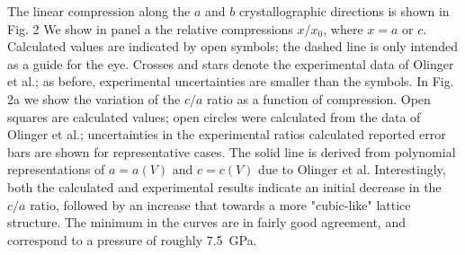 \documentclass[prb,aps,nobibnotes,twocolumn,doublespace,twocolumngrid,superbib]{revtex4}
\begin{document}
The linear compression along the $a$ and $b$ crystallographic directions
is shown in Fig. 2  We show in panel a the relative compressions $x/x_0$, 
where $x=a$ or $c$.  Calculated values are indicated by open symbols; the 
dashed line is only intended as a guide for the eye.  Crosses and stars 
denote the experimental data of Olinger et al.; as before, experimental 
uncertainties are smaller than the symbols.  In Fig. 2a we show the variation
of the $c/a$ ratio as a function of compression.  Open squares are 
calculated values; open circles were calculated from the data of Olinger
et al.; uncertainties in the experimental ratios calculated reported 
error bars are shown for representative cases.  The solid line is derived
from polynomial representations of $a=a(V)$ and $c=c(V)$ due to Olinger
et al.  Interestingly, both the calculated and experimental results indicate
an initial decrease in the $c/a$ ratio, followed by an increase that
towards a more "cubic-like" lattice structure.  The minimum in the
curves are in fairly good agreement, and correspond to a pressure of 
roughly 7.5~GPa.
\end{document}
